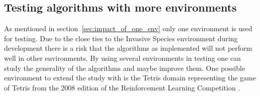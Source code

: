 \subsection{Testing algorithms with more environments}

As mentioned in section~\ref{sec:impact_of_one_env} only one environment is
used for testing. Due to the close ties to the Invasive Species environment
during development there is a risk that the algorithms as implemented will not
perform well in other environments. By using several environments in testing
one can study the generality of the algorithms and maybe improve them. One
possible environment to extend the study with is the Tetris domain representing
the game of Tetris from the 2008 edition of the Reinforcement Learning
Competition \parencite{whiteson2010reinforcement}.  
